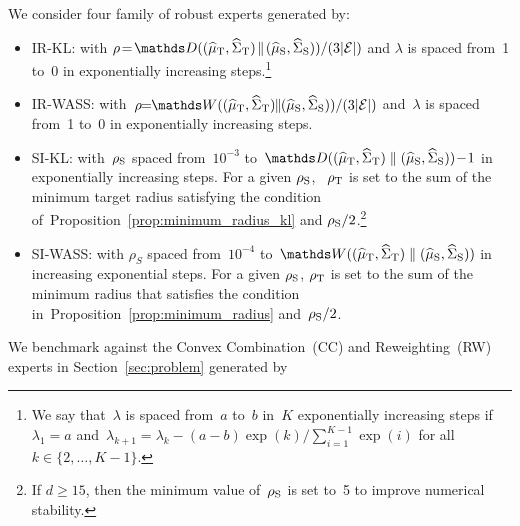 \documentclass{article}
\begin{document}
We consider four family of robust experts generated by:
\begin{itemize}[leftmargin =3mm, itemsep=0.5mm]
\vspace{-.3cm}
    \item IR-KL: with $\rho\!=\!\mathds D((\msa_{\rm T}, \covsa_{\rm T})\! \parallel\! (\msa_{\rm S}, \covsa_{\rm S}) ) / (3|\mc E|)$ and $\lambda$ is spaced from~1 to~0 in exponentially increasing steps.\footnote{We say that~$\lambda$ is spaced from~$a$ to~$b$ in~$K$ exponentially increasing steps if~$\lambda_1 = a$ and~$\lambda_{k+1} = \lambda_{k} - (a  - b) \exp(k)/ \sum_{i=1}^{K-1} \exp(i)$ for all $k\in\{2,\ldots, K-1\}$.}
    
    \item IR-WASS: with~$\rho\!\!=\!\!\mathds W((\msa_{\rm T}, \covsa_{\rm T}) \!\!\parallel\!\! (\msa_{\rm S}, \covsa_{\rm S}) ) / (3|\mc E|)$ and~$\lambda$ is spaced from~1 to~0 in exponentially increasing steps.
    
    \item SI-KL: with~$\rho_{\rm S}$ spaced from~$10^{-3}$ to~$\mathds D((\msa_{\rm T}, \covsa_{\rm T})~\!\!\parallel\!\!~(\msa_{\rm S}, \covsa_{\rm S}) )\!-\!1$ in exponentially increasing steps.
    For a given $\rho_{\rm S}$, ~$\rho_{\rm T} $ is set to the sum of the minimum target radius satisfying the condition of~Proposition~\ref{prop:minimum_radius_kl} and $\rho_{\rm S} / 2$.\footnote{If $d\geq 15$, then the minimum value of~$\rho_{\rm S}$ is set to~5 to improve numerical stability.}
    \item SI-WASS: with $\rho_S$ spaced from~$10^{-4}$ to~$\mathds W((\msa_{\rm T}, \covsa_{\rm T}) \parallel (\msa_{\rm S}, \covsa_{\rm S}) )$ in increasing exponential steps. For a given $\rho_{\rm S}$, $\rho_{\rm T} $ is set to the sum of the minimum radius that satisfies the condition in~Proposition~\ref{prop:minimum_radius} and~$\rho_{\rm S} / 2$.
    \end{itemize}
    \vspace{-.3cm}
    We benchmark against the Convex Combination~(CC) and Reweighting~(RW) experts in Section~\ref{sec:problem} generated by 
\end{document}
